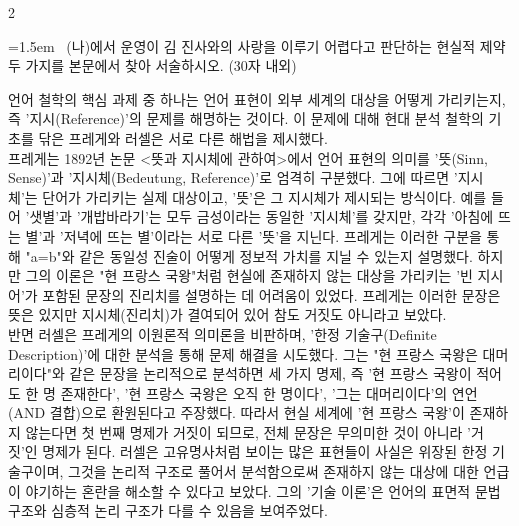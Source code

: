 \documentclass[10pt, a4paper]{article}
\begin{document}
\begin{multicols}{2}
\noindent\begin{minipage}{\columnwidth}
\vspace{2mm}
{\hangindent=1.5em  ~(나)에서 운영이 김 진사와의 사랑을 이루기 어렵다고 판단하는 현실적 제약 두 가지를 본문에서 찾아 서술하시오. (30자 내외)\par}

\vspace{3mm}
\noindent\hrulefill
\vspace{2.5mm}
\noindent\hrulefill
\vspace{2.5mm}
\noindent\hrulefill
\vspace{2.5mm}
\noindent\hrulefill
\vspace{2.5mm}
\noindent\hrulefill
\vspace{2.5mm}
\vspace{1mm}
\vspace{4mm}
\end{minipage}
\par


\vspace{1mm}
\vspace{0.5mm}

\begin{passagebox}
\noindent{}언어 철학의 핵심 과제 중 하나는 언어 표현이 외부 세계의 대상을 어떻게 가리키는지, 즉 '지시(Reference)'의 문제를 해명하는 것이다. 이 문제에 대해 현대 분석 철학의 기초를 닦은 프레게와 러셀은 서로 다른 해법을 제시했다.
\\[0.5em]
프레게는 1892년 논문 <뜻과 지시체에 관하여>에서 언어 표현의 의미를 '뜻(Sinn, Sense)'과 '지시체(Bedeutung, Reference)'로 엄격히 구분했다. 그에 따르면 '지시체'는 단어가 가리키는 실제 대상이고, '뜻'은 그 지시체가 제시되는 방식이다. 예를 들어 '샛별'과 '개밥바라기'는 모두 금성이라는 동일한 '지시체'를 갖지만, 각각 '아침에 뜨는 별'과 '저녁에 뜨는 별'이라는 서로 다른 '뜻'을 지닌다. 프레게는 이러한 구분을 통해 "a=b"와 같은 동일성 진술이 어떻게 정보적 가치를 지닐 수 있는지 설명했다. 하지만 그의 이론은 "현 프랑스 국왕"처럼 현실에 존재하지 않는 대상을 가리키는 '빈 지시어'가 포함된 문장의 진리치를 설명하는 데 어려움이 있었다. 프레게는 이러한 문장은 뜻은 있지만 지시체(진리치)가 결여되어 있어 참도 거짓도 아니라고 보았다.
\\[0.5em]
반면 러셀은 프레게의 이원론적 의미론을 비판하며, '한정 기술구(Definite Description)'에 대한 분석을 통해 문제 해결을 시도했다. 그는 "현 프랑스 국왕은 대머리이다"와 같은 문장을 논리적으로 분석하면 세 가지 명제, 즉 '현 프랑스 국왕이 적어도 한 명 존재한다', '현 프랑스 국왕은 오직 한 명이다', '그는 대머리이다'의 연언(AND 결합)으로 환원된다고 주장했다. 따라서 현실 세계에 '현 프랑스 국왕'이 존재하지 않는다면 첫 번째 명제가 거짓이 되므로, 전체 문장은 무의미한 것이 아니라 '거짓'인 명제가 된다. 러셀은 고유명사처럼 보이는 많은 표현들이 사실은 위장된 한정 기술구이며, 그것을 논리적 구조로 풀어서 분석함으로써 존재하지 않는 대상에 대한 언급이 야기하는 혼란을 해소할 수 있다고 보았다. 그의 '기술 이론'은 언어의 표면적 문법 구조와 심층적 논리 구조가 다를 수 있음을 보여주었다.
\end{passagebox}
\vspace{1mm}


\end{multicols}
\end{document}
